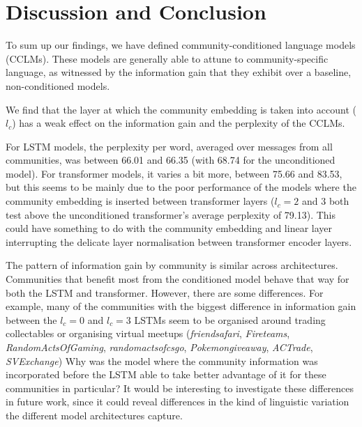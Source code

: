\documentclass[11pt]{article}
\begin{document}
\section{Discussion and Conclusion}\label{sec:discussion-conclusion}


To sum up our findings, we have defined community-conditioned language
models (CCLMs). These models are generally able to attune to
community-specific language, as witnessed by the information gain that
they exhibit over a baseline, non-conditioned models.

We find that the layer at which the community embedding is taken into
account ($l_c$) has a weak effect on the information gain and the
perplexity of the CCLMs.

For LSTM models, the perplexity per word, averaged over
messages from all communities, was between \num{66.01} and \num{66.35}
(with \num{68.74} for the unconditioned model).
For transformer models, it varies a bit more, between \num{75.66} and \num{83.53},
but this seems to be mainly due to the poor performance of the models where
the community embedding is inserted between transformer layers
($l_c=2$ and $3$ both test above the unconditioned transformer's 
average perplexity of \num{79.13}).
This could have something to do with the community embedding and linear layer
interrupting the delicate layer normalisation between transformer encoder layers.

The pattern of information gain by community is similar across
architectures.  Communities that benefit most from the conditioned
model behave that way for both the LSTM and transformer.  However,
there are some differences.  For example, many of the communities with the biggest 
difference in information gain between the $l_c=0$ and $l_c=3$ LSTMs 
seem to be organised around trading collectables or organising virtual meetups
(\emph{friendsafari},
\emph{Fireteams},
\emph{RandomActsOfGaming},
\emph{randomactsofcsgo},
\emph{Pokemongiveaway},
\emph{ACTrade},
\emph{SVExchange})
Why was the model where the community information was incorporated before
the LSTM able to take better advantage of it for these communities in particular? 
It would be interesting to investigate these differences in future work, since it
could reveal differences in the kind of linguistic variation the
different model architectures capture.


\end{document}
